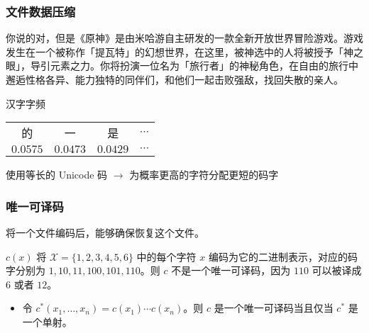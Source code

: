 \documentclass{beamer}
\newcommand{\concept}[1]{{\color{blue} #1}}
\begin{document}
\begin{frame}
    \frametitle{文件数据压缩}

    \begin{example}
        你说的对，但是《原神》是由米哈游自主研发的一款全新开放世界冒险游戏。游戏发生在一个被称作「提瓦特」的幻想世界，在这里，被神选中的人将被授予「神之眼」，导引元素之力。你将扮演一位名为「旅行者」的神秘角色，在自由的旅行中邂逅性格各异、能力独特的同伴们，和他们一起击败强敌，找回失散的亲人。
    \end{example}

    \begin{block}{汉字字频}
        \begin{table}
            \begin{tabular}{cccc}
                的 & 一 & 是 & $\cdots$ \\
                $0.0575$ & $0.0473$ & $0.0429$ & $\cdots$
            \end{tabular}
        \end{table}
    \end{block}

    使用等长的 Unicode 码 $\rightarrow$ 为概率更高的字符分配更短的码字

\end{frame}

\begin{frame}
    \frametitle{唯一可译码}

    将一个文件编码后，能够确保恢复这个文件。


    \begin{example}
        $c(x)$ 将 $\mathcal{X} = \{1, 2, 3, 4, 5, 6\}$ 中的每个字符 $x$ 编码为它的二进制表示，对应的码字分别为 $1, 10, 11, 100, 101, 110$。则 $c$ 不是一个唯一可译码，因为 $110$ 可以被译成 $6$ 或者 $12$。
    \end{example}

    \begin{itemize}
        \item 令 $c^*(x_1, \dots, x_n) = c(x_1)\cdots c(x_n)$。则 $c$ 是一个唯一可译码当且仅当 $c^*$ 是一个单射。
    \end{itemize}

\end{frame}
\end{document}
